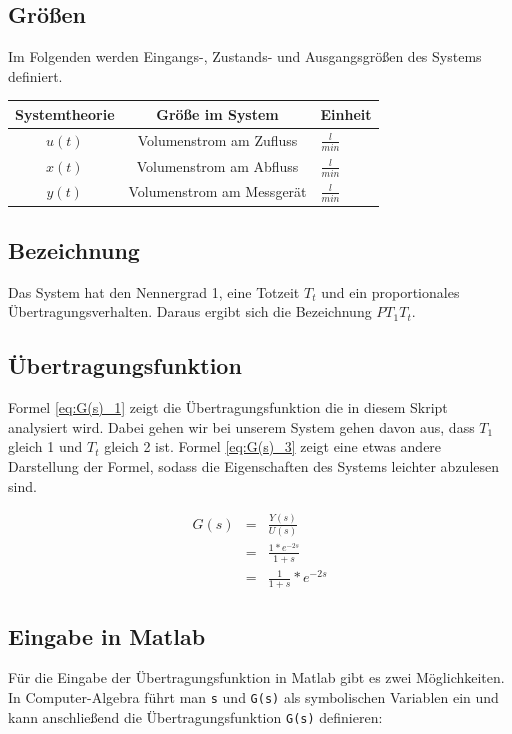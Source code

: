 \subsection{Größen}
Im Folgenden werden Eingangs-, Zustands- und Ausgangsgrößen des Systems definiert.
\renewcommand{\arraystretch}{1.5}
\begin{center}
    \begin{tabular}{ c|c|l } 
    Systemtheorie  & Größe im System & Einheit \\
    \hline
    $u(t)$ & Volumenstrom am Zufluss & $\frac{l}{min}$ \\ 
    $x(t)$ & Volumenstrom am Abfluss &  $\frac{l}{min}$\\ 
    $y(t)$ & Volumenstrom am Messgerät & $\frac{l}{min}$ \\ 
    \end{tabular}
\end{center}


\subsection{Bezeichnung}
Das System hat den Nennergrad 1, eine Totzeit $T_t$ und ein proportionales Übertragungsverhalten. Daraus ergibt sich die Bezeichnung $PT_{1}T_{t}$.

\subsection{Übertragungsfunktion}

Formel \ref{eq:G(s)_1} zeigt die Übertragungsfunktion die in diesem Skript analysiert wird. Dabei gehen wir bei unserem System gehen davon aus, dass $T_1$ gleich 1 und $T_t$ gleich 2 ist. Formel \ref{eq:G(s)_3} zeigt eine etwas andere Darstellung der Formel, sodass die Eigenschaften des Systems leichter abzulesen sind.

\begin{eqnarray}
    \label{eq:G(s)_1}
    G(s) &=& \frac{Y(s)}{U(s)} \\
    \label{eq:G(s)_2}
    &=& \frac{1 * e^{-2s}}{1+s} \\
    \label{eq:G(s)_3}
    &=& \frac{1}{1 + s} * e^{-2s}
\end{eqnarray}

\subsection{Eingabe in Matlab}
Für die Eingabe der Übertragungsfunktion in Matlab gibt es zwei Möglichkeiten. \\
In Computer-Algebra führt man \texttt{s} und \texttt{G(s)} als symbolischen Variablen ein und kann anschließend die Übertragungsfunktion \texttt{G(s)} definieren:

